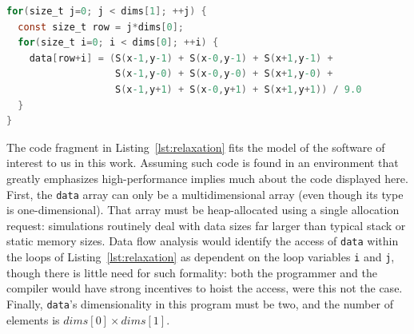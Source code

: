 \begin{lstlisting}[float=*,label=lst:relaxation,language=C,caption=A code
fragment representative of simulation software.  A large array is smoothed using
a set of nested loops. \texttt{S} is presumed to be a macro that
samples \texttt{data} while properly accounting for edge cases.]
for(size_t j=0; j < dims[1]; ++j) {
  const size_t row = j*dims[0];
  for(size_t i=0; i < dims[0]; ++i) {
    data[row+i] = (S(x-1,y-1) + S(x-0,y-1) + S(x+1,y-1) +
                   S(x-1,y-0) + S(x-0,y-0) + S(x+1,y-0) +
                   S(x-1,y+1) + S(x-0,y+1) + S(x+1,y+1)) / 9.0
  }
}
\end{lstlisting}

The code fragment in Listing~\ref{lst:relaxation} fits the model of the
software of interest to us in this work.  Assuming such code is found
in an environment that greatly emphasizes high-performance implies much
about the code displayed here.  First, the
\texttt{data} array can only be a multidimensional array (even though
its type is one-dimensional).  That array must be heap-allocated using
a single allocation request: simulations routinely deal with data
sizes far larger than typical stack or static memory sizes.  Data flow
analysis would identify
the access of \texttt{data} within the loops of
Listing~\ref{lst:relaxation} as dependent on the loop variables
\texttt{i} and \texttt{j}, though there is little need for such
formality: both the programmer and the compiler would have strong
incentives to hoist the access, were this not the case.  Finally,
\texttt{data}'s dimensionality in this program must be two, and the
number of elements is $dims[0] \times dims[1]$.

\newcommand{\pointsto}[0]{\rightarrow}
\newcommand{\union}[0]{\cup}


